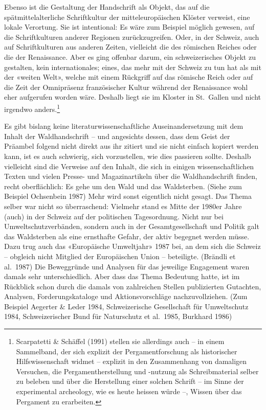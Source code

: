 \documentclass[a4paper,
fontsize=11pt,
oneside,
numbers=noperiodatend,
parskip=half-,
bibliography=totoc,
final
]{scrartcl}
\begin{document}
Ebenso ist die Gestaltung der Handschrift als Objekt, das auf die
spätmittelalterliche Schriftkultur der mitteleuropäischen Klöster
verweist, eine lokale Verortung. Sie ist intentional: Es wäre zum
Beispiel möglich gewesen, auf die Schriftkulturen anderer Regionen
zurückzugreifen. Oder, in der Schweiz, auch auf Schriftkulturen aus
anderen Zeiten, vielleicht die des römischen Reiches oder die der
Renaissance. Aber es ging offenbar darum, ein schweizerisches Objekt zu
gestalten, kein internationales; eines, das mehr mit der Schweiz zu tun
hat als mit der «weiten Welt», welche mit einem Rückgriff auf das
römische Reich oder auf die Zeit der Omnipräsenz französischer Kultur
während der Renaissance wohl eher aufgerufen worden wäre. Deshalb liegt
sie im Kloster in St.~Gallen und nicht irgendwo anders.\footnote{Scarpatetti
  \& Schäffel (1991) stellen sie allerdings auch -- in einem Sammelband,
  der sich explizit der Pergamentforschung als historischer
  Hilfswissenschaft widmet -- explizit in den Zusammenhang von damaligen
  Versuchen, die Pergamentherstellung und -nutzung als Schreibmaterial
  selber zu beleben und über die Herstellung einer solchen Schrift -- im
  Sinne der experimental archeology, wie es heute heissen würde --,
  Wissen über das Pergament zu erarbeiten.}

Es gibt bislang keine literaturwissenschaftliche Auseinandersetzung mit
dem Inhalt der Waldhandschrift -- und angesichts dessen, dass dem Geist
der Präambel folgend nicht direkt aus ihr zitiert und sie nicht einfach
kopiert werden kann, ist es auch schwierig, sich vorzustellen, wie dies
passieren sollte. Deshalb vielleicht sind die Verweise auf den Inhalt,
die sich in einigen wissenschaftlichen Texten und vielen Presse- und
Magazinartikeln über die Waldhandschrift finden, recht oberflächlich: Es
gehe um den Wald und das Waldsterben. (Siehe zum Beispiel Ochsenbein
1987) Mehr wird sonst eigentlich nicht gesagt. Das Thema selber war
nicht so überraschend: Vielmehr stand es Mitte der 1980er Jahre (auch)
in der Schweiz auf der politischen Tagesordnung. Nicht nur bei
Umweltschutzverbänden, sondern auch in der Gesamtgesellschaft und
Politik galt das Waldsterben als eine ernsthafte Gefahr, der aktiv
begegnet werden müsse. Dazu trug auch das «Europäische Umweltjahr» 1987
bei, an dem sich die Schweiz -- obgleich nicht Mitglied der Europäischen
Union -- beteiligte. (Brändli et al.~1987) Die Beweggründe und Analysen
für das jeweilige Engagement waren damals sehr unterschiedlich. Aber
dass das Thema Bedeutung hatte, ist im Rückblick schon durch die damals
von zahlreichen Stellen publizierten Gutachten, Analysen,
Forderungskataloge und Aktionsvorschläge nachzuvollziehen. (Zum Beispiel
Aegerter \& Leder 1984, Schweizerische Gesellschaft für Umweltschutz
1984, Schweizerischer Bund für Naturschutz et al.~1985, Burkhard 1986)
\end{document}
